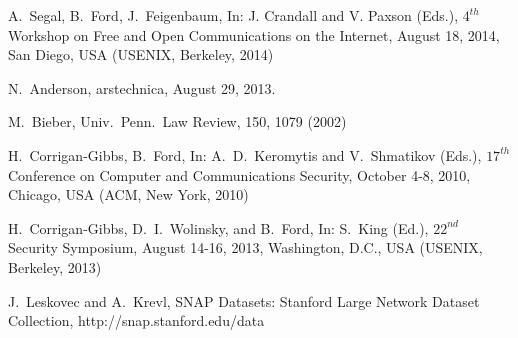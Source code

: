 \documentclass[USenglish,oneside,twocolumn]{article}
\begin{document}

\begin{thebibliography}{99}
 A.~Segal, B.~Ford, J.~Feigenbaum, 
In: J. Crandall and V. Paxson (Eds.), $4^{th}$ Workshop on Free and 
Open Communications on the Internet, August 18, 2014, San Diego, 
USA (USENIX, Berkeley, 2014)

 N.~Anderson, arstechnica, August 29, 2013. 

 M.~Bieber, Univ.~Penn.~Law Review, 150, 1079 (2002)

 H.~Corrigan-Gibbs, B.~Ford, In: A.~D.~Keromytis and 
V.~Shmatikov (Eds.), $17^{th}$ Conference on Computer and Communications 
Security, October 4-8, 2010, Chicago, USA (ACM, New York, 2010)

 H.~Corrigan-Gibbs, D.~I.~Wolinsky, and B.~Ford, In: 
S.~King (Ed.), $22^{nd}$ Security Symposium, August 14-16, 2013, 
Washington, D.C., USA (USENIX, Berkeley, 2013) 

 J.~Leskovec and A.~Krevl, SNAP Datasets: 
Stanford Large Network Dataset Collection, 
http://snap.stanford.edu/data


\end{thebibliography}
\end{document}
